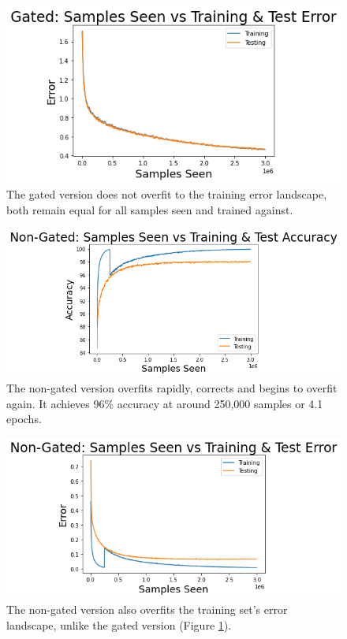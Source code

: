 \documentclass[prl,superscriptaddress,showpacs,twocolumn]{revtex4-1}
\begin{document}
\begin{figure}[H]
    \centering
    \includegraphics[width=\linewidth]{figures/gated_samples_vs_train_test_error.png}
    \caption{The gated version does not overfit to the training error landscape, both remain equal for all samples seen and trained against.}
    \label{fig:gated_err}
\end{figure}

\vspace{5cm}
\newpage

\begin{figure}[H]
    \centering
    \includegraphics[width=\linewidth]{figures/non_gated_samples_vs_train_test_accuracy.png}
    \caption{The non-gated version overfits rapidly, corrects and begins to overfit again. It achieves 96\% accuracy at around 250,000 samples or 4.1 epochs.}
    \label{fig:non_gated_acc}
\end{figure}

\begin{figure}[H]
    \centering
    \includegraphics[width=\linewidth]{figures/non_gated_samples_vs_train_test_error.png}
    \caption{The non-gated version also overfits the training set's error landscape, unlike the gated version (Figure \ref{fig:gated_err}).}
    \label{fig:non_gated_err}
\end{figure}
\end{document}
